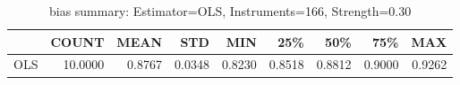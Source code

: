 \begin{table}[ht]
\centering
\caption{bias summary: Estimator=OLS, Instruments=166, Strength=0.30}
\begin{tabular}{lrrrrrrrr}
\toprule
 & COUNT & MEAN & STD & MIN & 25\% & 50\% & 75\% & MAX \\
\midrule
OLS & 10.0000 & 0.8767 & 0.0348 & 0.8230 & 0.8518 & 0.8812 & 0.9000 & 0.9262 \\
\bottomrule
\end{tabular}
\end{table}
